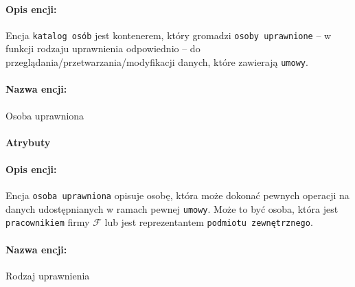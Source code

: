 \documentclass{article}
\begin{document}
\paragraph{Opis encji: \\}
Encja \texttt{katalog osób} jest kontenerem, który gromadzi \texttt{osoby uprawnione} -- w funkcji rodzaju uprawnienia odpowiednio -- do przeglądania/przetwarzania/modyfikacji danych, które zawierają \texttt{umowy}. 
\paragraph{Nazwa encji:\\ }
Osoba uprawniona
\paragraph{Atrybuty\\ }
\begin{table}[H]

\caption{Tabela z opisem encji.} 
\end{table}
\paragraph{Opis encji: \\}
Encja \texttt{osoba uprawniona} opisuje osobę, która może dokonać pewnych operacji na danych udostępnianych w ramach pewnej \texttt{umowy}. Może to być osoba, która jest \texttt{pracownikiem} firmy $\mathcal{F}$ lub jest reprezentantem \texttt{podmiotu zewnętrznego}.  
\paragraph{Nazwa encji:\\ }
Rodzaj uprawnienia
\end{document}
